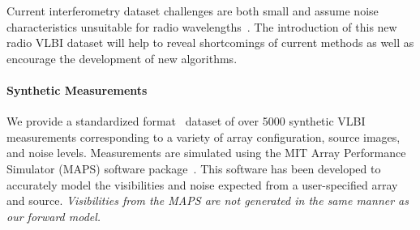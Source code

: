 Current interferometry dataset challenges are both small
and assume noise characteristics unsuitable for radio wavelengths~\cite{baron20122012, lawson2004interferometry}.
The introduction of this new radio VLBI dataset will help to reveal shortcomings of current methods as well as encourage the development of new algorithms. 






\paragraph{Synthetic Measurements}

We provide a standardized format~\cite{ pauls2005data} dataset of over 5000 synthetic VLBI measurements corresponding to
a variety of array configuration, source images, and noise levels. 
Measurements are simulated using the MIT Array Performance Simulator (MAPS) software package~\cite{rusenimaging}.
This software has been developed to accurately model the visibilities and noise expected from a user-specified array and source. {\it Visibilities from the MAPS are not generated in the same manner as our forward model.} 


